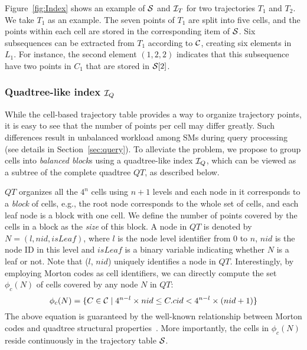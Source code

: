 \documentclass[10pt,conference,letterpaper]{IEEEtran}
\newcommand{\allcell}{{\cal C}\xspace}
\newcommand{\trajtable}{{\cal S}\xspace}
\newcommand{\trajindex}{{{\cal I}_T}\xspace}
\newcommand{\treeindex}{{{\cal I}_Q}\xspace}
\begin{document}
Figure~\ref{fig:Index} shows an example of $\trajtable$ and $\trajindex$ for two trajectories $T_1$ and $T_2$. We take $T_1$ as an example. The seven points of $T_1$ are split into five cells, and the points within each cell are stored in the corresponding item of $\trajtable$.
Six subsequences can be extracted from $T_1$ according to $\allcell$, creating six elements in $L_1$. For instance, the second element $(1,2,2)$ indicates that this subsequence have two points in $C_1$ that are stored in $\trajtable[2]$.


\subsubsection{Quadtree-like index $\treeindex$}
While the cell-based trajectory table provides a way to organize trajectory points, it is easy to see that the number of points per cell may differ greatly.
Such differences result in unbalanced workload among SMs during query processing (see details in Section~\ref{sec:query}). To alleviate the problem, we propose to group cells into \emph{balanced block}s using a quadtree-like index $\treeindex$,
which can be viewed as a subtree of the complete quadtree $QT$, as described below.

$QT$ organizes all the $4^n$ cells using $n+1$ levels and each node in it corresponds to a \emph{block} of cells, e.g., the root node corresponds to the whole set of cells, and each leaf node is a block with one cell. We define the number of points covered by the cells in a block as the \emph{size} of this block.
A node in $QT$ is denoted by $N=(l, nid, isLeaf)$, where $l$ is the node level identifier from $0$ to $n$, $nid$ is the node ID in this level and $isLeaf$ is a binary variable indicating whether $N$ is a leaf or not.
Note that ($l$, $nid$) uniquely identifies a node in $QT$.
Interestingly, by employing Morton codes as cell identifiers, we can directly compute the set $\phi_c(N)$ of cells covered by any node $N$ in $QT$:
\begin{equation}\label{eq:nodetocell}
\small
\phi_c(N) = \{C\in\allcell \mid 4^{n-l}\times nid \leq C.cid < 4^{n-l}\times (nid+1)  \}
\end{equation}
The above equation is guaranteed by the well-known relationship between Morton codes and quadtree structural properties~\cite{morton1966computer}.
More importantly, the cells in $\phi_c(N)$ reside continuously in the trajectory table $\trajtable$.
\end{document}

